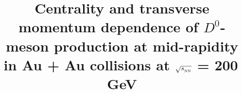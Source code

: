 \documentclass[%
 reprint,	
 amsmath,amssymb,
 aps,
 prc,
]{revtex4-1}
\begin{document}

\title{Centrality and transverse momentum dependence of $D^0$-meson production at mid-rapidity in Au + Au collisions at $\sqrt{s_{_{\rm NN}}}$ = 200\,GeV}%



\end{document}

